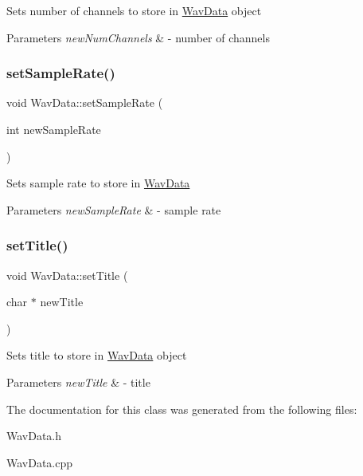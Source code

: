 Sets number of channels to store in \hyperlink{classWavData}{Wav\+Data} object 
\begin{DoxyParams}{Parameters}
{\em new\+Num\+Channels} & -\/ number of channels \\
\hline
\end{DoxyParams}
\mbox{\label{classWavData_a68f77a3b3c237f9c48640e6104410c11}} 
\subsubsection{\texorpdfstring{set\+Sample\+Rate()}{setSampleRate()}}
{\footnotesize\ttfamily void Wav\+Data\+::set\+Sample\+Rate (\begin{DoxyParamCaption}\item[{int}]{new\+Sample\+Rate }\end{DoxyParamCaption})}

Sets sample rate to store in \hyperlink{classWavData}{Wav\+Data} 
\begin{DoxyParams}{Parameters}
{\em new\+Sample\+Rate} & -\/ sample rate \\
\hline
\end{DoxyParams}
\mbox{\label{classWavData_a396b417c300117a9697d3fdbcee5d250}} 
\subsubsection{\texorpdfstring{set\+Title()}{setTitle()}}
{\footnotesize\ttfamily void Wav\+Data\+::set\+Title (\begin{DoxyParamCaption}\item[{char $\ast$}]{new\+Title }\end{DoxyParamCaption})}

Sets title to store in \hyperlink{classWavData}{Wav\+Data} object 
\begin{DoxyParams}{Parameters}
{\em new\+Title} & -\/ title \\
\hline
\end{DoxyParams}


The documentation for this class was generated from the following files\+:\begin{DoxyCompactItemize}
\item 
Wav\+Data.\+h\item 
Wav\+Data.\+cpp\end{DoxyCompactItemize}
